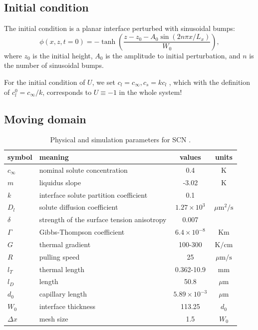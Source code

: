 \documentclass[a4paper,12pt]{article}
\begin{document}
\subsection{Initial condition}
The initial condition is a planar interface perturbed with sinusoidal bumps:
\begin{equation}
\phi(x,z,t=0) = - \tanh \left( \frac{z - z_0 - A_0\sin(2n\pi x /L_x  ) }{W_0}  \right),
\end{equation}
where $z_0$ is the initial height, $A_0$ is the amplitude to initial perturbation, and $n$ is the number of  sinusoidal bumps.  

For the initial condition of $U$, we set $c_l = c_{\infty}, c_s = k c_l$ \cite{Echebarria2004}, which with the definition of $c_l^0 = c_{\infty} /k $, corresponds to $U \equiv -1$ in the whole system!

\subsection{Moving domain}




\begin{table}
\centering
\caption{Physical and simulation parameters for SCN \cite{Tourret2015}.}
\begin{tabular}{l l c c }
\toprule
symbol & meaning & values & units \\
\midrule
$c_{\infty}$ & nominal solute concentration &  0.4 & K \\
$m$ &liquidus slope &  -3.02 & K \\
$k$ & interface solute partition coefficient & 0.1 &\\
$D_l$ & solute diffusion coefficient &  $1.27\times 10^{3}$  & ${\mu\text{m}}^2/\text{s}$ \\
$\delta$ & strength of the surface tension anisotropy  &  0.007  &\\
$\Gamma$ & Gibbs-Thompson coefficient & $6.4\times 10^{-8}$ & Km \\
$G$ & thermal gradient & 100-300 & $\text{K} / \text{cm}$ \\
$R$ & pulling speed &  25 & $\mu \text{m} / \text{s}$ \\
$l_T$ & thermal length &  0.362-10.9  & mm \\
$l_D$ & length &  50.8  & $\mu$m \\
$d_0$ & capillary length & $ 5.89\times10^{-3}$  & $\mu$m \\
$W_0$ & interface thickness  & 113.25 & $d_0$ \\
$\Delta x$ & mesh size & 1.5 & $W_0$ \\
\bottomrule
\end{tabular}\label{tab:SCN}

\end{table}
\end{document}
